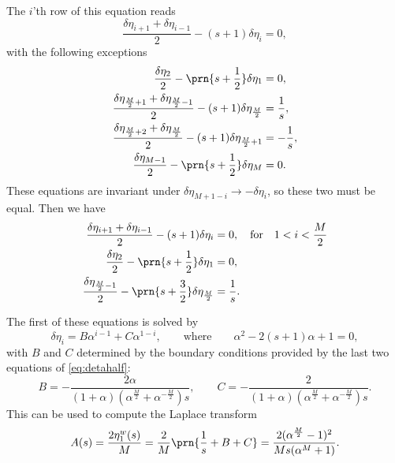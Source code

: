 \documentclass[12pt]{article}
\begin{document}
The $i$'th row of this equation reads
%
\begin{equation}\label{eq:detarow}
  \frac{\delta\eta_{i+1}+\delta\eta_{i-1}}{2} - (s+1)\delta\eta_i = 0,
\end{equation}
%
with the following exceptions
%
\begin{equation}\label{eq:detabnduni}
\begin{aligned}
  \frac{\delta\eta_2}{2} - \prn{s+\frac{1}{2}}\delta\eta_1 &= 0, \\
  \frac{\delta\eta_{\frac{M}{2}+1}+\delta\eta_{\frac{M}{2}-1}}{2} - (s+1)\delta\eta_{\frac{M}{2}} &= \frac{1}{s},\\
  \frac{\delta\eta_{\frac{M}{2}+2}+\delta\eta_{\frac{M}{2}}}{2} - (s+1)\delta\eta_{\frac{M}{2}+1} &= -\frac{1}{s},\\
  \frac{\delta\eta_{M-1}}{2} - \prn{s+\frac{1}{2}}\delta\eta_M &= 0.
\end{aligned}
\end{equation}
%
These equations are invariant under $\delta\eta_{M+1-i} \to -\delta\eta_i$, so these two must be equal.
Then we have
%
\begin{equation}\label{eq:detahalf}
\begin{aligned}
  \frac{\delta\eta_{i+1}+\delta\eta_{i-1}}{2} - (s+1)\delta\eta_i &= 0,
  \quad\text{for}\quad 1<i<\frac{M}{2}\\
  \frac{\delta\eta_2}{2} - \prn{s+\frac{1}{2}}\delta\eta_1 &= 0, \\
  \frac{\delta\eta_{\frac{M}{2}-1}}{2} - \prn{s+\frac{3}{2}}\delta\eta_{\frac{M}{2}} &= \frac{1}{s}.
\end{aligned}
\end{equation}
%

The first of these equations is solved by
%
\begin{equation}\label{eq:detagensol}
  \delta\eta_i = B\alpha^{i-1} + C\alpha^{1-i},
  \qquad\text{where}\qquad
  \alpha^2 - 2(s+1)\alpha + 1 = 0,
\end{equation}
%
with $B$ and $C$ determined by the boundary conditions provided by the last two equations of \eqref{eq:detahalf}:
%
\begin{equation}\label{eq:unicoeffs}
  B = -\frac{2\alpha}{(1+\alpha)(\alpha^{\frac{M}{2}}+\alpha^{-\frac{M}{2}})s},
  \qquad
  C = -\frac{2}{(1+\alpha)(\alpha^{\frac{M}{2}}+\alpha^{-\frac{M}{2}})s}.
\end{equation}
%
This can be used to compute the Laplace transform
%
\begin{equation}\label{eq:unilaplace}
  A(s) = \frac{2\eta^w_1(s)}{M} 
   = \frac{2}{M}\prn{\frac{1}{s}+B+C} 
   = \frac{2(\alpha^{\frac{M}{2}}-1)^2}{Ms(\alpha^M+1)}.
\end{equation}
%
\end{document}
